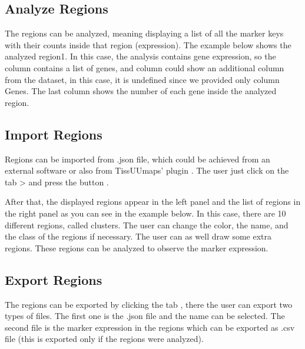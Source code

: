 \documentclass[letterpaper,10pt,english,openany,oneside]{sphinxmanual}
\begin{document}
\sphinxAtStartPar
{}


\subsection{Analyze Regions}
\label{\detokenize{docs/starting/regions:analyze-regions}}
\sphinxAtStartPar
The regions can be analyzed, meaning displaying a list of all the marker keys with their counts inside that region (expression). The example below shows the analyzed region1. In this case, the analysis contains gene expression, so the column  contains a list of genes, and column  could show an additional column from the dataset, in this case, it is undefined since we provided only column Genes. The last column  shows the number of each gene inside the analyzed region.

\sphinxAtStartPar
{}


\subsection{Import Regions}
\label{\detokenize{docs/starting/regions:import-regions}}
\sphinxAtStartPar
Regions can be imported from .json file, which could be achieved from an external software or also from TissUUmaps’ plugin . The user just click on the tab  \sphinxhyphen{}\textgreater{}  and press the button .

\sphinxAtStartPar
{}

\sphinxAtStartPar
After that, the displayed regions appear in the left panel and the list of regions in the right panel as you can see in the example below. In this case, there are 10 different regions, called clusters. The user can change the color, the name, and the class of the regions if necessary. The user can as well draw some extra regions. These regions can be analyzed to observe the marker expression.

\sphinxAtStartPar
{}


\subsection{Export Regions}
\label{\detokenize{docs/starting/regions:export-regions}}
\sphinxAtStartPar
The regions can be exported by clicking the tab , there the user can export two types of files. The first one is the .json file and the name can be selected. The second file is the marker expression in the regions which can be exported as .csv file (this is exported only if the regions were analyzed).
\end{document}
